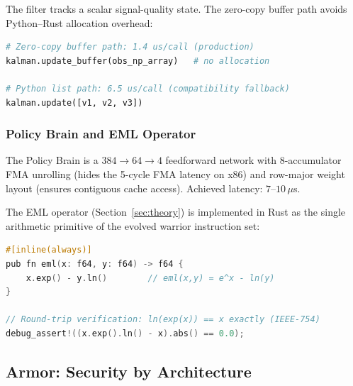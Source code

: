 \documentclass[12pt,a4paper]{article}
\begin{document}
The filter tracks a scalar signal-quality state. The zero-copy buffer path avoids
Python--Rust allocation overhead:

\begin{lstlisting}[language=Python, caption={PyO3 buffer vs.\ list path (latency comparison)}]
# Zero-copy buffer path: 1.4 us/call (production)
kalman.update_buffer(obs_np_array)   # no allocation

# Python list path: 6.5 us/call (compatibility fallback)
kalman.update([v1, v2, v3])
\end{lstlisting}

\subsubsection{Policy Brain and EML Operator}

The Policy Brain is a $384\!\to\!64\!\to\!4$ feedforward network with 8-accumulator FMA
unrolling (hides the 5-cycle FMA latency on x86) and row-major weight layout (ensures
contiguous cache access). Achieved latency: $7$--$10\,\mu$s.

The EML operator (Section~\ref{sec:theory}) is implemented in Rust as the single arithmetic
primitive of the evolved warrior instruction set:

\begin{lstlisting}[language=C, caption={EML operator implementation in Rust}]
#[inline(always)]
pub fn eml(x: f64, y: f64) -> f64 {
    x.exp() - y.ln()        // eml(x,y) = e^x - ln(y)
}

// Round-trip verification: ln(exp(x)) == x exactly (IEEE-754)
debug_assert!((x.exp().ln() - x).abs() == 0.0);
\end{lstlisting}

\subsection{Armor: Security by Architecture}
\label{sec:armor}
\end{document}
